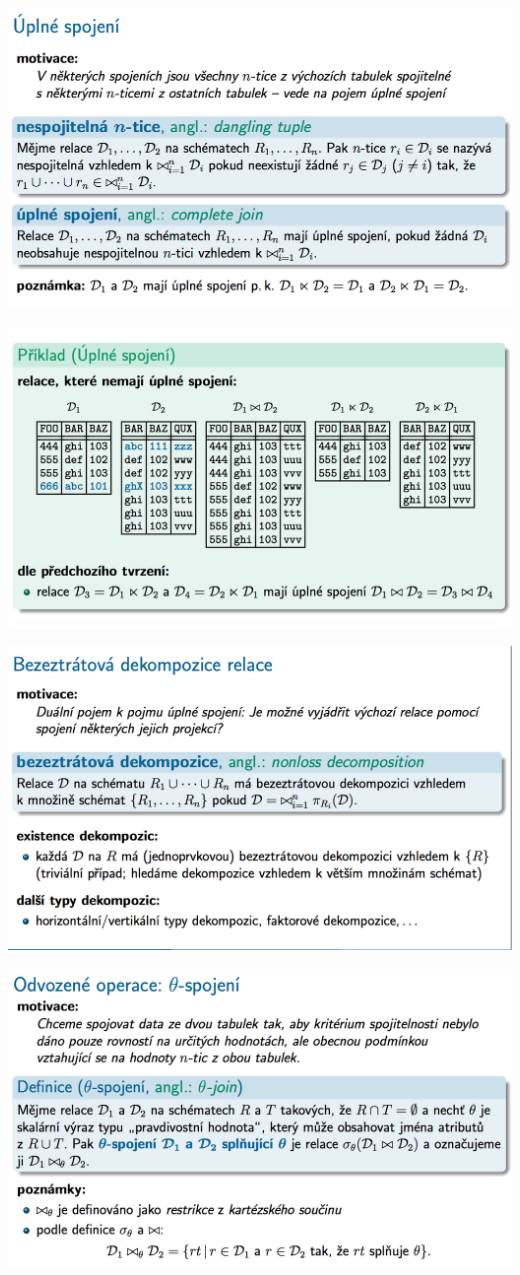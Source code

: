 \documentclass[10pt,a4paper]{article}
\begin{document}
	\includegraphics[scale=0.4]{img/51}
	
	\includegraphics[scale=0.4]{img/52}
	
	\includegraphics[scale=0.4]{img/53}
	
	\includegraphics[scale=0.4]{img/54}
	
\end{document}
